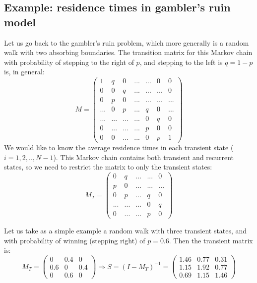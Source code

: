 \documentclass[11pt]{book}
\begin{document}
\subsection{Example: residence times in gambler's ruin model }
Let us go back to the gambler's ruin problem, which more generally is a random walk with two absorbing boundaries. The transition matrix for this Markov chain with probability of stepping to the right of $p$, and stepping to the left is $ q = 1 -p$ is, in general:
$$ M =  \left(\begin{array}{ccccccc}1 & q & 0 & ... & ... & 0 & 0 \\0 & 0 & q & ... & ... & ... & 0 \\0 & p & 0 & ... & ... & ... & ... \\... & 0 & p & ... & q & 0 & ... \\... & ... & ... & ... & 0 & q & 0 \\0 & ... & ... & ... & p & 0 & 0 \\0 & 0 & ... & ... & 0 & p & 1\end{array}\right)  $$
We would like to know the average residence times in each transient state ($i=1,2,.., N-1$). This Markov chain contains both transient and recurrent states, so we need to restrict the matrix to only the transient states:
$$ M_T =  \left(\begin{array}{ccccc} 0 & q & ... & ... & 0 \\ p & 0 & ... & ... & ... \\ 0 & p & ... & q & 0 \\ ... & ... & ... & 0 & q \\ 0 & ... & ... & p & 0 \end{array}\right)  $$

Let us take as a simple example a random walk with three transient states, and with probability of winning (stepping right) of $p=0.6$. Then the transient matrix is:
$$ M_T =  \left(\begin{array}{ccc} 0 & 0.4 &  0 \\ 0.6 & 0 & 0.4 \\ 0 & 0.6 & 0 \end{array}\right)  \Rightarrow S = (I - M_T)^{-1} = \left(\begin{array}{ccc}1.46 & 0.77 & 0.31 \\1.15 & 1.92 & 0.77 \\0.69 & 1.15 & 1.46\end{array}\right)$$
\end{document}
